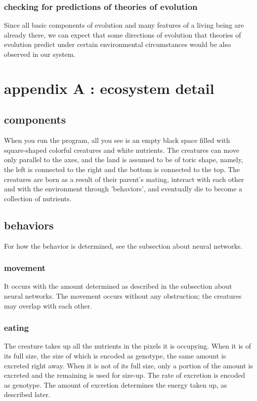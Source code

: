 \documentclass{amsart}
\theoremstyle{definition}
\theoremstyle{remark}
\numberwithin{equation}{section}
\begin{document}
\subsubsection{checking for predictions of theories of evolution}
Since all basic components of evolution and many features of a living being are already there, we can expect that some directions of evolution that theories of evolution predict under certain environmental circumstances would be also observed in our system.    

\section{appendix A : ecosystem detail}
\subsection{components}
When you run the program, all you see is an empty black space filled with square-shaped  colorful creatures and white nutrients. The creatures can move only parallel to the axes, and the land is assumed to be of toric shape, namely, the left is connected to the right and the bottom is connected to the top. The creatures are born as a result of their parent's mating, interact with each other  and with the environment through 'behaviors', and eventually die to become a collection of nutrients.
\subsection{behaviors}
For how the behavior is determined, see the subsection about neural networks. 
\subsubsection{movement}
It occurs with the amount determined as described in the subsection about neural networks. The movement occurs without any obstruction; the creatures may overlap with each other. 
\subsubsection{eating}
The creature takes up all the nutrients in the pixels it is occupying. When it is of its full size, the size of which is encoded as genotype, the same amount is excreted right away. When it is not of its full size, only a portion of the amount is excreted and the remaining is used for size-up. The rate of excretion is encoded as genotype. The amount of excretion determines the energy taken up, as described later. 
\end{document}

